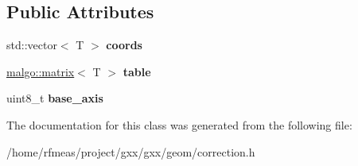\subsection*{Public Attributes}
\begin{DoxyCompactItemize}
\item 
std\+::vector$<$ T $>$ {\bfseries coords}\hypertarget{classgxx_1_1ngeom_1_1single__axis__correction__table_a826f8269142995ab776c0e65f6d84a85}{}\label{classgxx_1_1ngeom_1_1single__axis__correction__table_a826f8269142995ab776c0e65f6d84a85}

\item 
\hyperlink{classmalgo_1_1matrix}{malgo\+::matrix}$<$ T $>$ {\bfseries table}\hypertarget{classgxx_1_1ngeom_1_1single__axis__correction__table_aee820c3586f93870727216813176670c}{}\label{classgxx_1_1ngeom_1_1single__axis__correction__table_aee820c3586f93870727216813176670c}

\item 
uint8\+\_\+t {\bfseries base\+\_\+axis}\hypertarget{classgxx_1_1ngeom_1_1single__axis__correction__table_a6392bc5575e517874ea1fe23b9cb004e}{}\label{classgxx_1_1ngeom_1_1single__axis__correction__table_a6392bc5575e517874ea1fe23b9cb004e}

\end{DoxyCompactItemize}


The documentation for this class was generated from the following file\+:\begin{DoxyCompactItemize}
\item 
/home/rfmeas/project/gxx/gxx/geom/correction.\+h\end{DoxyCompactItemize}
